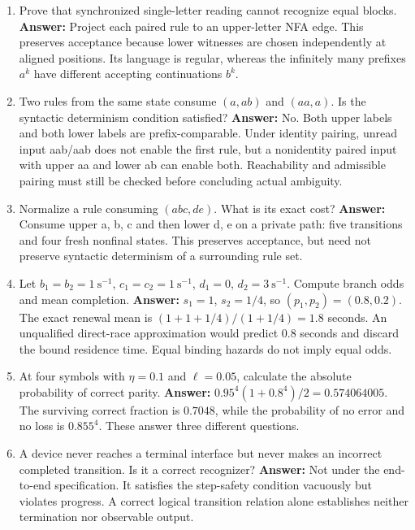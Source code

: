 \begin{enumerate}
\textbf{Answer:} The state labels are constant in number, but cursor positions
and the supplied input scale with $n$. The model has changed the resources
available to the recognizer.
\item Prove that synchronized single-letter reading cannot recognize equal
blocks. \textbf{Answer:} Project each paired rule to an upper-letter NFA edge.
This preserves acceptance because lower witnesses are chosen independently
at aligned positions. Its language is regular, whereas the infinitely many
prefixes $a^k$ have different accepting continuations $b^k$.
\item Two rules from the same state consume $(a,ab)$ and $(aa,a)$. Is the
syntactic determinism condition satisfied? \textbf{Answer:} No. Both upper
labels and both lower labels are prefix-comparable. Under identity pairing,
unread input aab/aab does not enable the first rule, but a nonidentity paired
input with upper aa and lower ab can enable both. Reachability and admissible
pairing must still be checked before concluding actual ambiguity.
\item Normalize a rule consuming $(abc,de)$. What is its exact cost?
\textbf{Answer:} Consume upper a, b, c and then lower d, e on a private path:
five transitions and four fresh nonfinal states. This preserves acceptance,
but need not preserve syntactic determinism of a surrounding rule set.
\item Let $b_1=b_2=1\ \mathrm{s}^{-1}$, $c_1=c_2=1\ \mathrm{s}^{-1}$,
$d_1=0$, $d_2=3\ \mathrm{s}^{-1}$. Compute branch odds and mean completion.
\textbf{Answer:} $s_1=1$, $s_2=1/4$, so $(p_1,p_2)=(0.8,0.2)$.
The exact renewal mean is $(1+1+1/4)/(1+1/4)=1.8$ seconds.
An unqualified direct-race approximation would predict $0.8$ seconds and
discard the bound residence time. Equal binding hazards do not imply equal odds.
\item At four symbols with $\eta=0.1$ and $\ell=0.05$, calculate the
absolute probability of correct parity. \textbf{Answer:}
$0.95^4(1+0.8^4)/2=0.574064005$. The surviving correct fraction is
$0.7048$, while the probability of no error and no loss is $0.855^4$.
These answer three different questions.
\item A device never reaches a terminal interface but never makes an
incorrect completed transition. Is it a correct recognizer?
\textbf{Answer:} Not under the end-to-end specification. It satisfies the
step-safety condition vacuously but violates progress. A correct logical
transition relation alone establishes neither termination nor observable output.
\end{enumerate}

